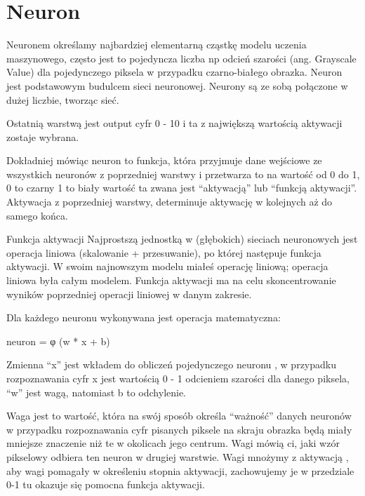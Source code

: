 \documentclass[brudnopis]{xmgr}
\begin{document}
\section{Neuron  \label{s:dsssl}}
Neuronem określamy najbardziej elementarną cząstkę modelu uczenia maszynowego, często jest to pojedyncza liczba np odcień szarości (ang. Grayscale Value) dla pojedynczego piksela w przypadku czarno-białego obrazka. Neuron jest podstawowym budulcem sieci neuronowej. Neurony są ze sobą połączone w dużej liczbie, tworząc sieć. 

Ostatnią warstwą jest output cyfr 0 - 10 i ta z największą wartością aktywacji zostaje wybrana. 

Dokładniej mówiąc neuron to funkcja, która przyjmuje dane wejściowe ze wszystkich neuronów z poprzedniej warstwy i przetwarza to na wartość od 0 do 1,
0 to czarny 1 to biały wartość ta zwana jest “aktywacją” lub “funkcją aktywacji”.
Aktywacja z poprzedniej warstwy, determinuje aktywację w kolejnych aż do samego końca. 

Funkcja aktywacji Najprostszą jednostką w (głębokich) sieciach neuronowych jest operacja liniowa (skalowanie + przesuwanie), po której następuje funkcja aktywacji. W swoim najnowszym modelu miałeś operację liniową; operacja liniowa była całym modelem. Funkcja aktywacji ma na celu skoncentrowanie wyników poprzedniej operacji liniowej w danym zakresie.

Dla każdego neuronu wykonywana jest operacja matematyczna:



neuron  = φ (w * x + b)



 Zmienna “x” jest wkładem do obliczeń pojedynczego neuronu , w przypadku rozpoznawania cyfr x jest wartością 0 - 1 odcieniem szarości dla danego piksela, “w” jest wagą, natomiast b to odchylenie.


Waga jest to wartość, która na swój sposób określa “ważność” danych neuronów w przypadku rozpoznawania cyfr pisanych piksele na skraju obrazka będą miały mniejsze znaczenie niż te w okolicach jego centrum. Wagi mówią ci, jaki wzór pikselowy odbiera ten neuron w drugiej warstwie. Wagi mnożymy z aktywacją ,  aby wagi pomagały w określeniu stopnia aktywacji, zachowujemy je w przedziale 0-1 tu okazuje się pomocna funkcja aktywacji.
\end{document}
